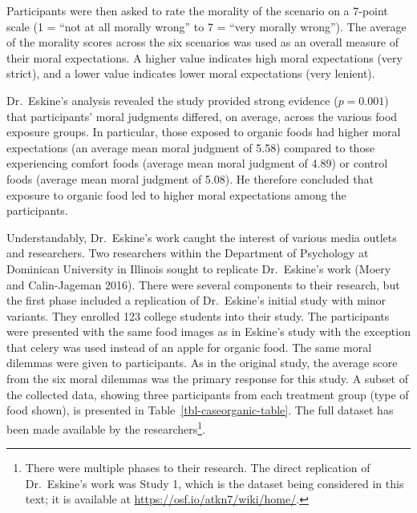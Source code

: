 \documentclass[
  letterpaper,
  DIV=11,
  numbers=noendperiod]{scrreprt}
\theoremstyle{definition}
\theoremstyle{definition}
\theoremstyle{plain}
\theoremstyle{remark}
\begin{document}
Participants were then asked to rate the morality of the scenario on a
7-point scale (1 = ``not at all morally wrong'' to 7 = ``very morally
wrong''). The average of the morality scores across the six scenarios
was used as an overall measure of their moral expectations. A higher
value indicates high moral expectations (very strict), and a lower value
indicates lower moral expectations (very lenient).

Dr.~Eskine's analysis revealed the study provided strong evidence
(\(p = 0.001\)) that participants' moral judgments differed, on average,
across the various food exposure groups. In particular, those exposed to
organic foods had higher moral expectations (an average mean moral
judgment of 5.58) compared to those experiencing comfort foods (average
mean moral judgment of 4.89) or control foods (average mean moral
judgment of 5.08). He therefore concluded that exposure to organic food
led to higher moral expectations among the participants.

Understandably, Dr.~Eskine's work caught the interest of various media
outlets and researchers. Two researchers within the Department of
Psychology at Dominican University in Illinois sought to replicate
Dr.~Eskine's work (Moery and Calin-Jageman 2016). There were several
components to their research, but the first phase included a replication
of Dr.~Eskine's initial study with minor variants. They enrolled 123
college students into their study. The participants were presented with
the same food images as in Eskine's study with the exception that celery
was used instead of an apple for organic food. The same moral dilemmas
were given to participants. As in the original study, the average score
from the six moral dilemmas was the primary response for this study. A
subset of the collected data, showing three participants from each
treatment group (type of food shown), is presented in
Table~\ref{tbl-caseorganic-table}. The full dataset has been made
available by the researchers\footnote{There were multiple phases to
  their research. The direct replication of Dr.~Eskine's work was Study
  1, which is the dataset being considered in this text; it is available
  at \url{https://osf.io/atkn7/wiki/home/}.}.
\end{document}
